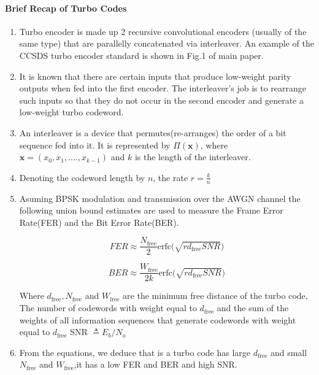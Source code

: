 \documentclass[fontsize=12pt]{article}
\begin{document}
\paragraph{Brief Recap of Turbo Codes \newline}
\begin{enumerate}
\item Turbo encoder is made up 2 recursive convolutional encoders (usually of the same type) that are parallelly concatenated via interleaver. An example of the CCSDS turbo encoder standard is shown in Fig.1 of main paper.

\item It is known that there are certain inputs that produce low-weight parity outputs when fed into the first encoder. The interleaver's job is to rearrange such inputs so that they do not occur in the second encoder and generate a low-weight turbo codeword.

\item An interleaver is a device that permutes(re-arranges) the order of a bit sequence fed into it. It is represented by $\Pi(\mathbf{x})$, where $\mathbf{x}=(x_0,x_1,....,x_{k-1})$ and $k$ is the length of the interleaver.

\item Denoting the codeword length by $n$, the rate $r=\frac{k}{n}$

\item Asuming BPSK modulation and transmission over the AWGN channel the following union bound estimates are used to measure the Frame Error Rate(FER) and the Bit Error Rate(BER).

\begin{equation}
FER \approx \frac{N_{\text{free}}}{2}\text{erfc}\Big(\sqrt{rd_{\text{free}}SNR}\Big)
\end{equation}

\begin{equation}
BER \approx \frac{W_{\text{free}}}{2k}\text{erfc}\Big(\sqrt{rd_{\text{free}}SNR}\Big)
\end{equation}

Where $d_{\text{free}}, N_{\text{free}}$ and $W_{\text{free}}$ are the minimum free distance of the turbo code, The number of codewords with weight equal to $d_{\text{free}}$ and the sum of the weights of all information sequences that generate codewords with weight equal to $d_{\text{free}}$ SNR $\triangleq E_b/N_o$

\item From the equations, we deduce that is a turbo code has large $d_{\text{free}}$ and small $N_{\text{free}}$ and $W_{\text{free}}$,it has a low FER and BER and high SNR.
\end{enumerate}
\end{document}
